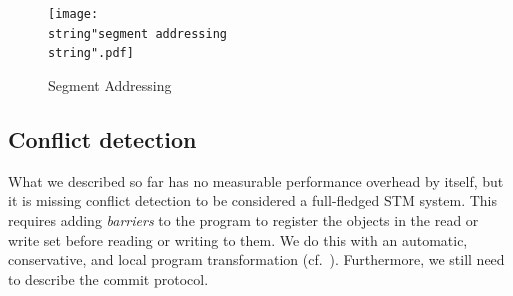 \documentclass{sigplanconf}
\begin{document}

\begin{figure}[t]
  \centering
  \texttt{[image: \\string"segment addressing\\string".pdf]}
  \caption{Segment Addressing\label{fig:Segment-Addressing}}
\end{figure}


\subsection{Conflict detection}

What we described so far has no measurable performance overhead by
itself, but it is missing conflict detection to be considered a
full-fledged STM system.  This requires adding \emph{barriers} to the
program to register the objects in the read or write set before
reading or writing to them. We do this with an automatic, conservative, and
local program transformation (cf.~\cite{felber07}).  Furthermore, we still
need to describe the commit protocol.
\end{document}
